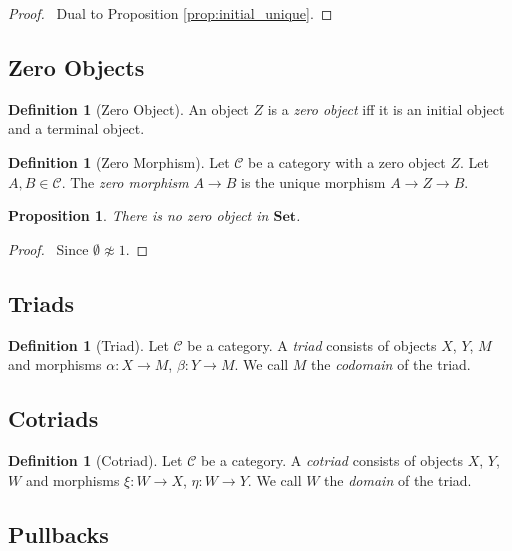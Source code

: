 \documentclass{book}
\let\qed\relax
\newtheorem{prop}[ax]{Proposition}
\theoremstyle{definition}
\newtheorem{df}[ax]{Definition}
\newcommand{\Set}{\ensuremath{\mathbf{Set}}}
\begin{document}
\begin{proof}
\pf\ Dual to Proposition \ref{prop:initial_unique}. \qed
\end{proof}

\subsection{Zero Objects}

\begin{df}[Zero Object]
An object $Z$ is a \emph{zero object} iff it is an initial object and a terminal object.
\end{df}

\begin{df}[Zero Morphism]
Let $\mathcal{C}$ be a category with a zero object $Z$. Let $A,B \in \mathcal{C}$. The \emph{zero morphism} $A \rightarrow B$ is the unique morphism $A \rightarrow Z \rightarrow B$.
\end{df}

\begin{prop}
There is no zero object in $\Set$.
\end{prop}

\begin{proof}
\pf\ Since $\emptyset \not\approx 1$. \qed
\end{proof}

\subsection{Triads}

\begin{df}[Triad]
Let $\mathcal{C}$ be a category. A \emph{triad} consists of objects $X$, $Y$, $M$ and morphisms $\alpha : X \rightarrow M$, $\beta : Y \rightarrow M$. We call $M$ the \emph{codomain} of the triad.
\end{df}

\subsection{Cotriads}

\begin{df}[Cotriad]
Let $\mathcal{C}$ be a category. A \emph{cotriad} consists of objects $X$, $Y$, $W$ and morphisms $\xi : W \rightarrow X$, $\eta : W \rightarrow Y$. We call $W$ the \emph{domain} of the triad.
\end{df}

\subsection{Pullbacks}
\end{document}
